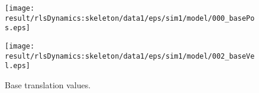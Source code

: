 \begin{figure}[h]
\centering
\begin{minipage}{0.24\linewidth}
\centering
\texttt{[image: \\result/rlsDynamics:skeleton/data1/eps/sim1/model/000\_basePos.eps]}
\par\footnotesize{}
\end{minipage}
\begin{minipage}{0.24\linewidth}
\centering
\texttt{[image: \\result/rlsDynamics:skeleton/data1/eps/sim1/model/002\_baseVel.eps]}
\par\footnotesize{}
\end{minipage}

\caption{Base translation values.}
\end{figure}
